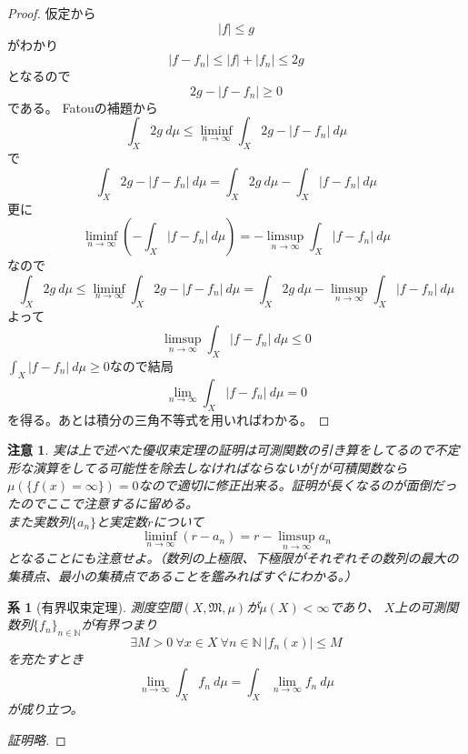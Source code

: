 \documentclass[leqno]{jsarticle}
\newtheorem{cor}[thm]{系}
\newtheorem*{cau}{注意}
\newcommand{\nn}{\mathbb{N}}
\newcommand{\mgn}{\infty}
\newcommand{\mm}{\mathfrak{M}}
\begin{document}
\begin{proof}
仮定から
\[
|f|\le g
\]
がわかり
\[
|f-f_n|\le|f|+|f_n|\le 2g
\]
となるので
\[
2g-|f-f_n|\ge 0
\]
である。
Fatouの補題から
\[
\int_X 2g\ d\mu\le \liminf_{n\to \mgn}\int_X 2g-|f-f_n|\ d\mu
\]
で
\[
\int_X 2g-|f-f_n|\ d\mu=\int_X 2g\ d\mu-\int_X |f-f_n|\ d\mu
\]
更に
\[
\liminf_{n\to \mgn}(-\int_X |f-f_n|\ d\mu)=-\limsup_{n\to \mgn}\int_X |f-f_n|\ d\mu
\]
なので
\[
\int_X 2g\ d\mu\le \liminf_{n\to \mgn}\int_X 2g-|f-f_n|\ d\mu=
\int_X 2g\ d\mu-\limsup_{n\to \mgn}\int_X |f-f_n|\ d\mu
\]
よって
\[
\limsup_{n\to \mgn}\int_X |f-f_n|\ d\mu\le 0
\]
$\int_X |f-f_n|\ d\mu\ge 0$なので結局
\[
\lim_{n\to \mgn}\int_X |f-f_n|\ d\mu=0
\]
を得る。あとは積分の三角不等式を用いればわかる。
\end{proof}

\begin{cau}
実は上で述べた優収束定理の証明は可測関数の引き算をしてるので不定形な演算をしてる可能性を除去しなければならないが$f$が可積関数なら$\mu(\{ f(x)=\mgn\})=0$なので適切に修正出来る。証明が長くなるのが面倒だったのでここで注意するに留める。\\ 
また実数列$\{a_n\}$と実定数$r$について
\[
\liminf_{n\to \mgn}(r-a_n)=r-\limsup_{n\to\mgn}a_n
\]
となることにも注意せよ。（数列の上極限、下極限がそれぞれその数列の最大の集積点、最小の集積点であることを鑑みればすぐにわかる。）
\end{cau}

\begin{cor}[有界収束定理]測度空間$(X,\mm,\mu)$が$\mu(X)<\mgn$であり、
$X$上の可測関数列$\{f_n\}_{n\in\nn}$が有界つまり
\[
\exists M>0\ \forall x\in X\ \forall n\in \nn\ |f_n(x)|\le M
\]
を充たすとき
\[
\lim_{n\to\mgn}\int_Xf_n\ d\mu=\int_X\lim_{n\to\mgn}f_n\ d\mu
\]
が成り立つ。
\end{cor}
\begin{proof}[証明略]
\end{proof}
\end{document}
